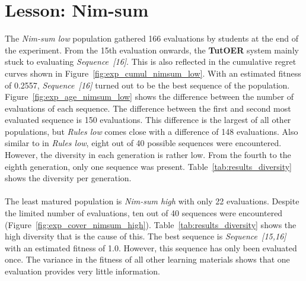 \section{Lesson: Nim-sum}
\label{sec:results_nimsum}
The \emph{Nim-sum low} population gathered 166 evaluations by students at the
end of the experiment. From the 15th evaluation onwards, the \textbf{TutOER}
system mainly stuck to evaluating \emph{Sequence~[16]}. This is also reflected
in the cumulative regret curves shown in Figure~\ref{fig:exp_cumul_nimsum_low}.
With an estimated fitness of 0.2557, \emph{Sequence~[16]} turned out to be the
best sequence of the population. Figure~\ref{fig:exp_age_nimsum_low} shows the
difference between the number of evaluations of each sequence. The difference
between the first and second most evaluated sequence is 150 evaluations. This
difference is the largest of all other populations, but \emph{Rules low} comes
close with a difference of 148 evaluations. Also similar to in \emph{Rules
low}, eight out of 40 possible sequences were encountered. However, the
diversity in each generation is rather low. From the fourth to the eighth
generation, only one sequence was present. Table~\ref{tab:results_diversity}
shows the diversity per generation.\\\\
\noindent
The least matured population is \emph{Nim-sum high} with only 22 evaluations.
Despite the limited number of evaluations, ten out of 40 sequences were
encountered (Figure~\ref{fig:exp_cover_nimsum_high}).
Table~\ref{tab:results_diversity} shows the high diversity that is the cause of
this. The best sequence is \emph{Sequence~[15,16]} with an estimated fitness of
1.0. However, this sequence has only been evaluated once. The variance in the
fitness of all other learning materials shows that one evaluation provides very
little information.

